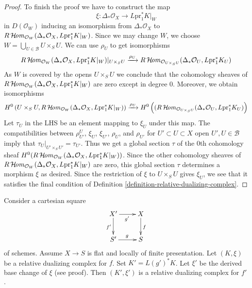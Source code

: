 \begin{proof}
\medskip\noindent
To finish the proof we have to construct the map
$$
\xi : \Delta_*\mathcal{O}_X \longrightarrow L\text{pr}_1^*K|_W
$$
in $D(\mathcal{O}_W)$ inducing an isomorphism from $\Delta_*\mathcal{O}_X$ to
$R\mathop{\mathcal{H}\!\mathit{om}}\nolimits_{\mathcal{O}_W}(\Delta_*\mathcal{O}_X, L\text{pr}_1^*K|_W)$.
Since we may change $W$, we choose
$W = \bigcup_{U \in \mathcal{B}} U \times_S U$.
We can use $\rho_U$ to get isomorphisms
$$
R\mathop{\mathcal{H}\!\mathit{om}}\nolimits_{\mathcal{O}_W}(
\Delta_*\mathcal{O}_X, L\text{pr}_1^*K|_W)|_{U \times_S U}
\xrightarrow{\rho_U}
R\mathop{\mathcal{H}\!\mathit{om}}\nolimits_{\mathcal{O}_{U \times_S U}}(
\Delta_*\mathcal{O}_U, L\text{pr}_1^*K_U)
$$
As $W$ is covered by the opens $U \times_S U$
we conclude that the cohomology sheaves of
$R\mathop{\mathcal{H}\!\mathit{om}}\nolimits_{\mathcal{O}_W}(\Delta_*\mathcal{O}_X, L\text{pr}_1^*K|_W)$
are zero except in degree $0$. Moreover, we obtain isomorphisms
$$
H^0\left(U \times_S U, R\mathop{\mathcal{H}\!\mathit{om}}\nolimits_{\mathcal{O}_W}(\Delta_*\mathcal{O}_X,
L\text{pr}_1^*K|_W)\right)
\xrightarrow{\rho_U}
H^0\left((R\mathop{\mathcal{H}\!\mathit{om}}\nolimits_{\mathcal{O}_{U \times_S U}}(
\Delta_*\mathcal{O}_U, L\text{pr}_1^*K_U)\right)
$$
Let $\tau_U$ in the LHS be an element mapping to $\xi_U$ under this map.
The compatibilities between
$\rho^U_{U'}$, $\xi_U$, $\xi_{U'}$, $\rho_U$, and $\rho_{U'}$
for $U' \subset U \subset X$ open $U', U \in \mathcal{B}$
imply that $\tau_U|_{U' \times_S U'} = \tau_{U'}$.
Thus we get a global section $\tau$ of the $0$th cohomology sheaf
$H^0(R\mathop{\mathcal{H}\!\mathit{om}}\nolimits_{\mathcal{O}_W}(\Delta_*\mathcal{O}_X, L\text{pr}_1^*K|_W))$.
Since the other cohomology sheaves of
$R\mathop{\mathcal{H}\!\mathit{om}}\nolimits_{\mathcal{O}_W}(\Delta_*\mathcal{O}_X, L\text{pr}_1^*K|_W)$
are zero, this global section $\tau$
determines a morphism $\xi$ as desired. Since the restriction
of $\xi$ to $U \times_S U$ gives $\xi_U$, we see that it
satisfies the final condition of
Definition \ref{definition-relative-dualizing-complex}.
\end{proof}

\begin{lemma}
\label{lemma-base-change-relative-dualizing}
Consider a cartesian square
$$
\xymatrix{
X' \ar[d]_{f'} \ar[r]_{g'} & X \ar[d]^f \\
S' \ar[r]^g & S
}
$$
of schemes. Assume $X \to S$ is flat and locally of finite presentation.
Let $(K, \xi)$ be a relative dualizing complex for $f$.
Set $K' = L(g')^*K$. Let $\xi'$ be the derived base change of $\xi$
(see proof). Then $(K', \xi')$ is a relative dualizing complex for $f'$.
\end{lemma}

